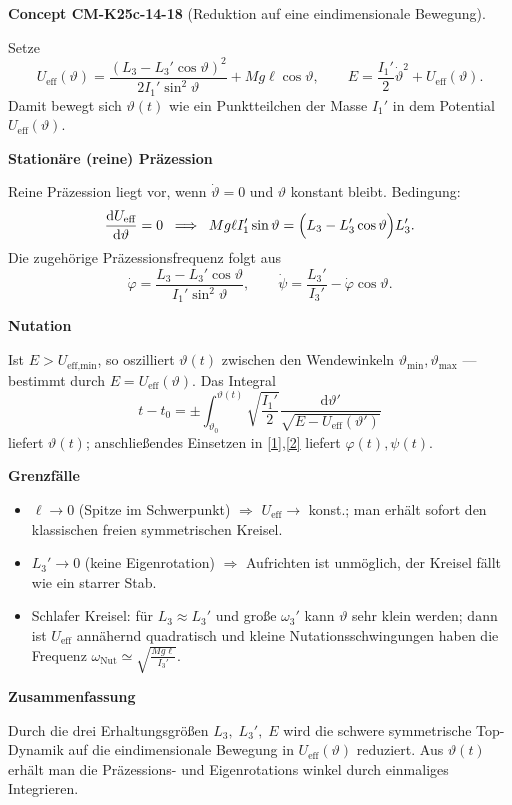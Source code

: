 \documentclass[10pt, letterpaper]{article}
\newcommand{\CustomHeading}[3]{%
  \par\medskip\noindent%
  \textbf{#1 #2} \textnormal{(#3)}.\enskip%
}
\newenvironment{CONC}[2]{\begin{unitbox}\CustomHeading{Concept}{#1}{#2}}{\end{unitbox}}
\begin{document}
\begin{CONC}{CM-K25c-14-18}{Reduktion auf eine eindimensionale Bewegung}
Setze
\[
U_{\text{eff}}(\vartheta)=
  \frac{(L_3-L_3'\cos\vartheta)^{2}}{2I_1'\sin^{2}\vartheta}
  +Mg\ell\cos\vartheta ,
\qquad
E=\frac{I_1'}{2}\dot{\vartheta}^{2}+U_{\text{eff}}(\vartheta).
\tag{3$'$}
\]
Damit bewegt sich \(\vartheta(t)\) wie ein Punktteilchen der Masse
\(I_1'\) in dem Potential \(U_{\text{eff}}(\vartheta)\).

\textbf{Stationäre (reine) Präzession}

Reine Präzession liegt vor, wenn \(\dot{\vartheta}=0\) und
\(\vartheta\) konstant bleibt.  
Bedingung:
\[
\frac{\mathrm dU_{\text{eff}}}{\mathrm d\vartheta}=0
\;\;\Longrightarrow\;\;
Mg\ell I_1'\sin\vartheta
=\Bigl(L_3-L_3'\cos\vartheta\Bigr)L_3'.
\]
Die zugehörige Präzessionsfrequenz folgt aus
\[
\dot{\varphi}
 =\frac{L_3-L_3'\cos\vartheta}{I_1'\sin^{2}\vartheta},
\qquad
\dot{\psi}
 =\frac{L_3'}{I_3'}-\dot{\varphi}\cos\vartheta .
\]

\textbf{Nutation}

Ist \(E>U_{\text{eff,min}}\), so oszilliert \(\vartheta(t)\) zwischen
den Wendewinkeln \(\vartheta_{\min },\vartheta_{\max }\) —
bestimmt durch \(E=U_{\text{eff}}(\vartheta)\).  
Das Integral
\[
t-t_0
 =\pm\int_{\vartheta_0}^{\vartheta(t)}
     \sqrt{\frac{I_1'}{2}}
     \frac{\mathrm d\vartheta'}
          {\sqrt{E-U_{\text{eff}}(\vartheta')}} 
\]
liefert \(\vartheta(t)\); anschließendes Einsetzen in
\eqref{1},\eqref{2} liefert \(\varphi(t),\psi(t)\).

\textbf{Grenzfälle}

\begin{itemize}
\item \(\ell\to 0\) (Spitze im Schwerpunkt) $\Rightarrow$
      \(U_{\text{eff}}\to\) konst.; man erhält sofort den
      klassischen freien symmetrischen Kreisel.
\item \(L_3'\to 0\) (keine Eigenrotation) $\Rightarrow$
      Aufrichten ist unmöglich, der Kreisel fällt wie ein starrer Stab.
\item Schlafer Kreisel:
      für \(L_3\!\approx\!L_3'\) und große \(\omega_3'\) kann
      \(\vartheta\) sehr klein werden; dann ist
      \(U_{\text{eff}}\) annähernd quadratisch und 
      kleine Nutations­schwingungen haben die Frequenz
      \(\displaystyle
        \omega_{\text{Nut}}
        \simeq\sqrt{\frac{Mg\ell}{I_3'}}\).
\end{itemize}

\textbf{Zusammenfassung}

Durch die drei Erhaltungsgrößen
\(
  L_3,\;L_3',\;E
\)
wird die schwere symmetrische Top-Dynamik auf die eindimensionale
Bewegung in \(U_{\text{eff}}(\vartheta)\) reduziert.
Aus \(\vartheta(t)\) erhält man die Präzessions- und Eigenrotations­
winkel durch einmaliges Integrieren.
\end{CONC}
\end{document}
